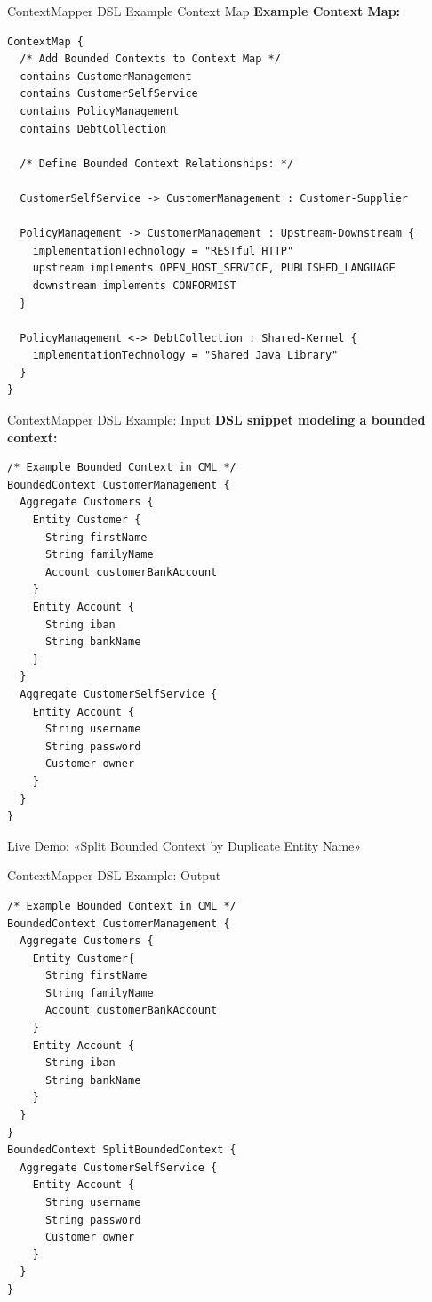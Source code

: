 \documentclass[10pt]{beamer}
\begin{document}
\begin{frame}[fragile]{ContextMapper DSL Example Context Map}
	\textbf{Example Context Map:}
	
\begin{verbatim}
ContextMap {
  /* Add Bounded Contexts to Context Map */
  contains CustomerManagement
  contains CustomerSelfService
  contains PolicyManagement
  contains DebtCollection
  
  /* Define Bounded Context Relationships: */
  
  CustomerSelfService -> CustomerManagement : Customer-Supplier
  
  PolicyManagement -> CustomerManagement : Upstream-Downstream {
    implementationTechnology = "RESTful HTTP"
    upstream implements OPEN_HOST_SERVICE, PUBLISHED_LANGUAGE
    downstream implements CONFORMIST
  }
  
  PolicyManagement <-> DebtCollection : Shared-Kernel {
    implementationTechnology = "Shared Java Library"
  }
}
\end{verbatim}

\end{frame}

\begin{frame}[fragile]{ContextMapper DSL Example: Input}
	\textbf{DSL snippet modeling a bounded context:}
	
\begin{verbatim}
/* Example Bounded Context in CML */
BoundedContext CustomerManagement {
  Aggregate Customers {
    Entity Customer {
      String firstName
      String familyName
      Account customerBankAccount
    }
    Entity Account {
      String iban
      String bankName
    }
  } 
  Aggregate CustomerSelfService {
    Entity Account {
      String username
      String password
      Customer owner
    }
  }
}
\end{verbatim}

\end{frame}

\begin{frame}[standout]
  Live Demo: «Split Bounded Context by Duplicate Entity Name»
\end{frame}

\begin{frame}[fragile]{ContextMapper DSL Example: Output}
\begin{verbatim}
/* Example Bounded Context in CML */
BoundedContext CustomerManagement {
  Aggregate Customers {
    Entity Customer{
      String firstName
      String familyName
      Account customerBankAccount
    }
    Entity Account {
      String iban
      String bankName
    }
  } 
}
BoundedContext SplitBoundedContext {
  Aggregate CustomerSelfService {
    Entity Account {
      String username
      String password
      Customer owner
    }
  }
}
\end{verbatim}

\end{frame}
\end{document}
